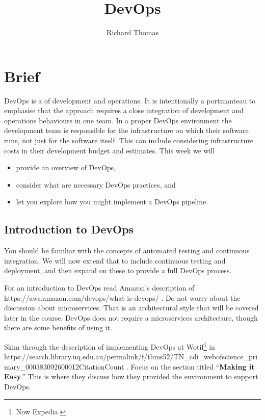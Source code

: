 \documentclass{csse4400}
\title{DevOps}
\author{Richard Thomas}
\date{\week[tutorial]{5}}
\begin{document}
\maketitle

\section{Brief}
DevOps is a  of development and operations.
It is intentionally a portmanteau to emphasise that the approach requires a close integration
of development and operations behaviours in one team.
In a proper DevOps environment the development team is responsible for the infrastructure on which their software runs,
not just for the software itself.
This can include considering infrastructure costs in their development budget and estimates.
This week we will
\begin{itemize}
    \item provide an overview of DevOps,
    \item consider what are necessary DevOps practices, and
    \item let you explore how you might implement a DevOps pipeline.
\end{itemize}


\subsection{Introduction to DevOps}
You should be familiar with the concepts of automated testing and continuous integration.
We will now extend that to include continuous testing and deployment,
and then expand on these to provide a full DevOps process.

For an introduction to DevOps read Amazon's description of 
{https://aws.amazon.com/devops/what-is-devops/} \cite{AWS-DevOps}.
Do not worry about the discussion about microservices.
That is an architectural style that will be covered later in the course.
DevOps does not require a microservices architecture,
though there are some benefits of using it.

Skim through the description of implementing DevOps at Wotif\footnote{Now Expedia.} in
{https://search.library.uq.edu.au/permalink/f/tbms52/TN_cdi_webofscience_primary_000383092600012CitationCount}
\cite{CallananMatt2016DMIE}.
Focus on the section titled ``\textbf{Making it Easy}.''
This is where they discuss how they provided the environment to support DevOps.
\end{document}

